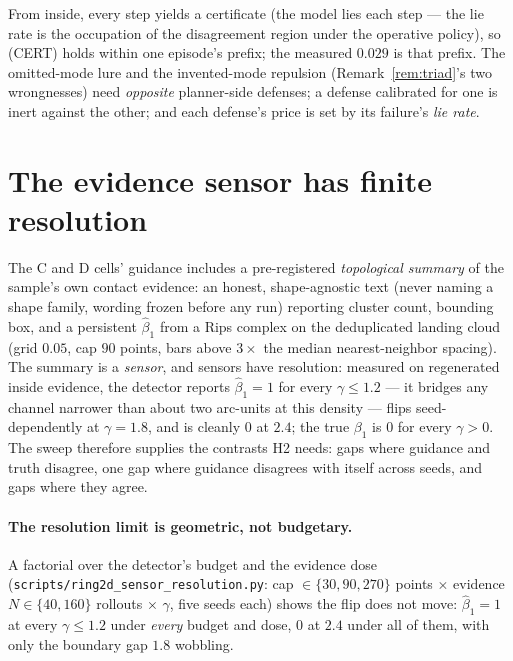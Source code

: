 \documentclass[11pt]{article}
\theoremstyle{remark}
\begin{document}
From inside, every step yields a certificate (the model lies each step ---
the lie rate is the occupation of the disagreement region under the
operative policy), so (CERT) holds within one episode's prefix; the
measured $0.029$ is that prefix. The omitted-mode lure and the invented-mode repulsion
(Remark~\ref{rem:triad}'s two wrongnesses) need \emph{opposite}
planner-side defenses; a defense calibrated for one is inert against the
other; and each defense's price is set by its failure's \emph{lie rate}.

\section{The evidence sensor has finite resolution}
\label{sec:sensor}

The C and D cells' guidance includes a pre-registered
\emph{topological summary} of the sample's own contact evidence: an
honest, shape-agnostic text (never naming a shape family, wording frozen
before any run) reporting cluster count, bounding box, and a persistent
$\hat\beta_1$ from a Rips complex on the deduplicated landing cloud
(grid $0.05$, cap $90$ points, bars above $3\times$ the median
nearest-neighbor spacing). The summary is a \emph{sensor}, and sensors
have resolution: measured on regenerated inside evidence, the detector
reports $\hat\beta_1 = 1$ for every $\gamma \le 1.2$ --- it bridges any
channel narrower than about two arc-units at this density --- flips
seed-dependently at $\gamma = 1.8$, and is cleanly $0$ at $2.4$; the true
$\beta_1$ is $0$ for every $\gamma > 0$. The sweep therefore supplies
the contrasts H2 needs: gaps where
guidance and truth disagree, one gap where guidance disagrees with itself
across seeds, and gaps where they agree.

\paragraph{The resolution limit is geometric, not budgetary.} A factorial
over the detector's budget and the evidence dose
(\texttt{scripts/ring2d\_sensor\_resolution.py}: cap
$\in \{30, 90, 270\}$ points $\times$ evidence
$N \in \{40, 160\}$ rollouts $\times$ $\gamma$, five seeds each)
shows the flip does not move: $\hat\beta_1 = 1$ at every
$\gamma \le 1.2$ under \emph{every} budget and dose, $0$ at $2.4$ under
all of them, with only the boundary gap $1.8$ wobbling.
\end{document}
